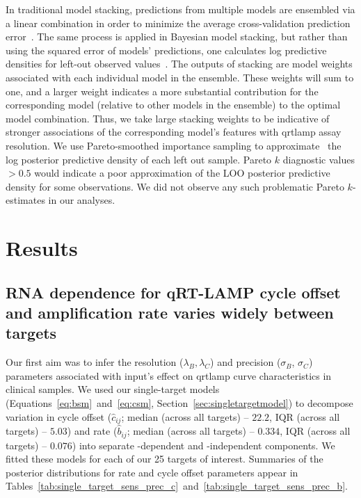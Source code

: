 \documentclass[../thesis.tex]{subfiles}
\begin{document}
In traditional model stacking, predictions from multiple models are ensembled via a linear combination in order to minimize the average cross-validation prediction error~\citep{wolpert_stacked_1992}. The same process is applied in Bayesian model stacking, but rather than using the squared error of models' predictions, one calculates log predictive densities for left-out observed values~\citep{yao_using_2018}. The outputs of stacking are model weights associated with each individual model in the ensemble. These weights will sum to one, and a larger weight indicates a more substantial contribution for the corresponding model (relative to other models in the ensemble) to the optimal model combination. Thus, we take large stacking weights to be indicative of stronger associations of the corresponding model's features with \gls{qrtlamp} assay resolution. We use Pareto-smoothed importance sampling to approximate~\citep{vehtari_practical_2017, vehtari_pareto_2021} the log posterior predictive density of each left out sample. Pareto $k$ diagnostic values $>0.5$ would indicate a poor approximation of the LOO posterior predictive density for some observations. We did not observe any such problematic Pareto $k$-estimates in our analyses.

\section{Results \label{sec:results}}

\subsection{RNA dependence for qRT-LAMP cycle offset and amplification rate varies widely between targets\label{sec:sensitivityprecision}}
Our first aim was to infer the resolution ($\lambda_B, \lambda_C$) and precision ($\sigma_{B}$, $\sigma_{C}$) parameters associated with  input's effect on \gls{qrtlamp} curve characteristics in clinical samples. We used our single-target models (Equations~\ref{eq:bsm}~and~\ref{eq:csm}, Section~\ref{sec:singletargetmodel}) to decompose variation in cycle offset ($\hat{c}_{ij}$; median (across all targets) -- $22.2$, IQR (across all targets) -- $5.03$) and rate ($\hat{b}_{ij}$; median (across all targets) -- $0.334$, IQR (across all targets) -- $0.076$) into separate -dependent and -independent components. We fitted these models for each of our 25 targets of interest. Summaries of the posterior distributions for rate and cycle offset parameters appear in Tables~\ref{tab:single_target_sens_prec_c}~and~\ref{tab:single_target_sens_prec_b}. 
\end{document}
